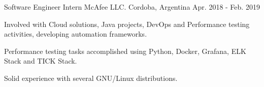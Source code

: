 \begin{cventries}
  \cventry
    {Software Engineer Intern} %
    {McAfee LLC.} %
    {Cordoba, Argentina} %
    {Apr. 2018 - Feb. 2019} %
    {
      \begin{cvitems} %
        \item {Involved with Cloud solutions, Java projects, DevOps and Performance testing activities, developing automation frameworks.}
        \item {Performance testing tasks accomplished using Python, Docker, Grafana, ELK Stack and TICK Stack.}
        \item { Solid experience with several GNU/Linux distributions.}
      \end{cvitems}
    }

\end{cventries}